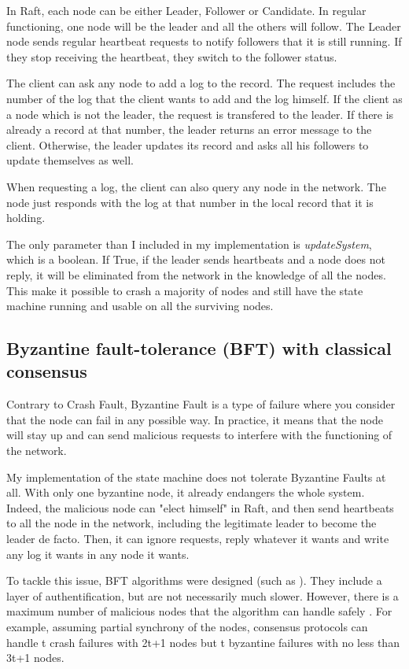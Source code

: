\documentclass[11pt, twocolumn]{article}
\begin{document}
In Raft, each node can be either Leader, Follower or Candidate. In regular functioning, one node will be the leader and all the others will follow.
The Leader node sends regular heartbeat requests to notify followers that it is still running. If they stop receiving the heartbeat, they switch to the follower status.

The client can ask any node to add a log to the record.
The request includes the number of the log that the client wants to add and the log himself. If the client as a node which is not the leader, the request is transfered to the leader. If there is already a record at that number,
the leader returns an error message to the client. Otherwise, the leader updates its record and asks all his followers to update themselves as well.

When requesting a log, the client can also query any node in the network. The node just responds with the log at that number in the local record that it is holding.

The only parameter than I included in my implementation is \emph{updateSystem}, which is a boolean. If True, if the leader sends heartbeats and a node does not reply, it will be eliminated from the network in the knowledge of all the nodes. This make it possible to
crash a majority of nodes and still have the state machine running and usable on all the surviving nodes.

\subsection{Byzantine fault-tolerance (BFT) with classical consensus}

Contrary to Crash Fault, Byzantine Fault \cite{byzantine} is a type of failure where you consider that the node can fail in any possible way. In practice, it means that the node will stay up and can send malicious requests to
interfere with the functioning of the network.

My implementation of the state machine does not tolerate Byzantine Faults at all. With only one byzantine node, it already endangers the whole system. Indeed, the malicious node can "elect himself" in Raft, and then send heartbeats to all
the node in the network, including the legitimate leader to become the leader de facto. Then, it can ignore requests, reply whatever it wants and write any log it wants in any node it wants.

To tackle this issue, BFT algorithms were designed (such as \cite{pbft}). They include a layer of authentification, but are not necessarily much slower. However, there is a maximum number of malicious nodes that the algorithm can handle safely \cite{partialSynchrony}.
For example, assuming partial synchrony of the nodes, consensus protocols can handle t crash failures with 2t+1 nodes but t byzantine failures with no less than 3t+1 nodes.
\end{document}
